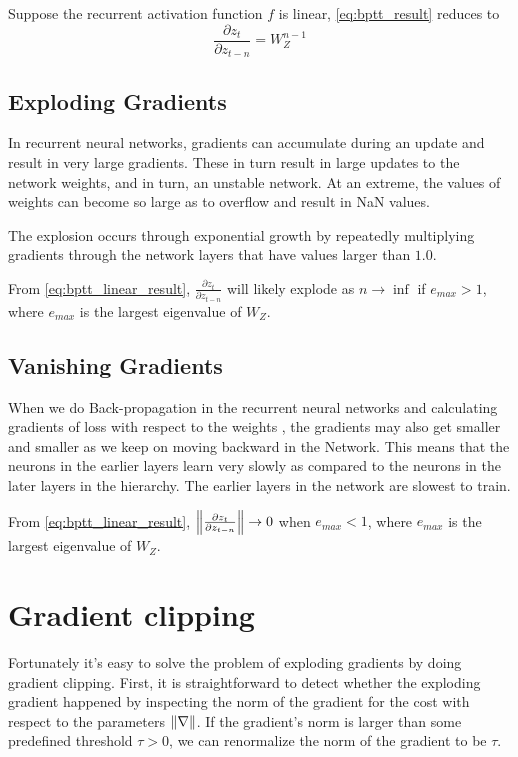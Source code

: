 Suppose the recurrent activation function $f$ is linear, \cref{eq:bptt_result} reduces to
\begin{equation} \label{eq:bptt_linear_result}
\frac{\partial z_t}{\partial z_{t-n}} = W_Z^{n-1}
\end{equation}


\subsection{Exploding Gradients}
In recurrent neural networks, gradients can accumulate during an update and result in very large gradients. 
These in turn result in large updates to the network weights, and in turn, an unstable network. 
At an extreme, the values of weights can become so large as to overflow and result in NaN values.

The explosion occurs through exponential growth by repeatedly multiplying gradients through the network layers that have values larger than $1.0$.

From \cref{eq:bptt_linear_result}, $\frac{\partial z_t}{\partial z_{t-n}}$ will likely explode as $n \rightarrow \inf$ if $e_{max} > 1$, where $e_{max}$ is the largest eigenvalue of $W_Z$.

\subsection{Vanishing Gradients}
When we do Back-propagation in the recurrent neural networks and calculating gradients of loss with respect to the weights , the gradients may also get smaller and smaller as we keep on moving backward in the Network. 
This means that the neurons in the earlier layers learn very slowly as compared to the neurons in the later layers in the hierarchy. 
The earlier layers in the network are slowest to train.

From \cref{eq:bptt_linear_result}, $\norm{\frac{\partial z_t}{\partial z_{t-n}}} \rightarrow 0$ when $e_{max} < 1$, where $e_{max}$ is the largest eigenvalue of $W_Z$.

\section{Gradient clipping}
Fortunately it's easy to solve the problem of exploding gradients by doing gradient clipping.
First, it is straightforward to detect whether the exploding gradient happened by inspecting the norm of the gradient for the cost with respect to the parameters $\norm{\nabla}$.
If the gradient's norm is larger than some predefined threshold $\tau > 0$, we can renormalize the norm of the gradient to be $\tau$.

